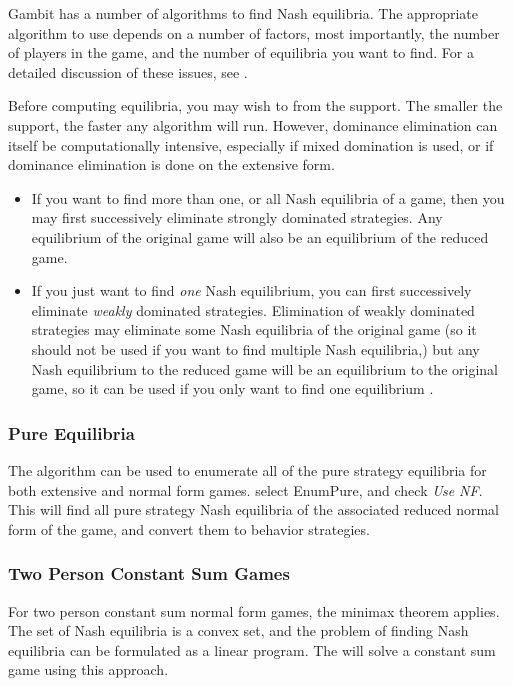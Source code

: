 \documentclass[12pt]{report}
\begin{document}
Gambit has a number of algorithms to find Nash equilibria.  The
appropriate algorithm to use depends on a number of factors, most
importantly, the number of players in the game, and the number of
equilibria you want to find.  For a detailed discussion of these
issues, see \cite{McKMcL:1996}.

Before computing equilibria, you may wish to  from the support.  The smaller the
support, the faster any algorithm will run.  However, dominance
elimination can itself be computationally intensive, especially if
mixed domination is used, or if dominance elimination is done on the
extensive form.

\begin{itemize}
\item 
If you want to find more than one, or all Nash equilibria of a game,
then you may first successively eliminate strongly dominated
strategies.  Any equilibrium of the original game will also be an
equilibrium of the reduced game.
\item 
If you just want to find {\em one} Nash equilibrium, you can first
successively eliminate {\em weakly} dominated strategies.  Elimination
of weakly dominated strategies may eliminate some Nash equilibria of
the original game (so it should not be used if you want to find
multiple Nash equilibria,) but any Nash equilibrium to the reduced
game will be an equilibrium to the original game, so it can be used if
you only want to find one equilibrium .
\end{itemize}

\subsubsection{Pure Equilibria}\label{purenashsec}
The  algorithm can be used to enumerate
all of the pure strategy equilibria for both extensive and normal form
games.  select EnumPure, and check {\em Use NF}.  This will find all pure
strategy Nash equilibria of the associated reduced normal form of the
game, and convert them to behavior strategies.

\subsubsection{Two Person Constant Sum Games}\label{csumsec}
For two person constant sum normal form games, the minimax theorem
applies.  The set of Nash equilibria is a convex set, and the problem
of finding Nash equilibria can be formulated as a linear program.  The 
 will solve a constant sum game using this
approach.
\end{document}
